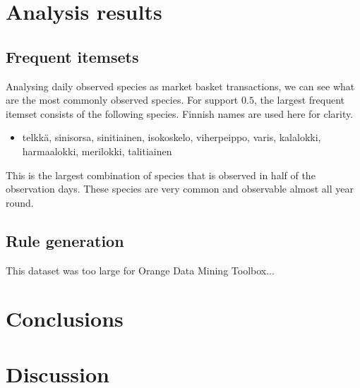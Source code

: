 \documentclass[english]{tktltiki2}
\begin{document}
\section{Analysis results}

\subsection{Frequent itemsets}

Analysing daily observed species as market basket transactions, we can see what are the most commonly observed species.
For support $0.5$, the largest frequent itemset consists of the following species. Finnish names are used here for clarity.

\begin{itemize}
\item[] telkkä, sinisorsa, sinitiainen, isokoskelo, viherpeippo, varis, kalalokki, harmaalokki, merilokki, talitiainen
\end{itemize}

This is the largest combination of species that is observed in half of the observation days. These species are very common and observable almost all year round.


\subsection{Rule generation}

This dataset was too large for Orange Data Mining Toolbox...

\section{Conclusions}



\section{Discussion}



\pagebreak

%
%
% 
%




\lastpage
\end{document}
